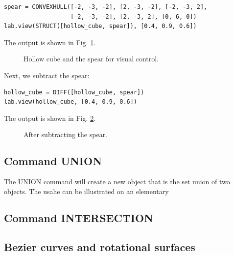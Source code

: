 \documentclass[article,A4,12pt]{llncs}
\begin{document}
\begin{verbatim}
spear = CONVEXHULL([-2, -3, -2], [2, -3, -2], [-2, -3, 2], 
                   [-2, -3, -2], [2, -3, 2], [0, 6, 0]) 
lab.view(STRUCT([hollow_cube, spear]), [0.4, 0.9, 0.6])
\end{verbatim}
The output is shown in Fig. \ref{fig:diff-5}.
\newpage

\begin{figure}[!ht]
\begin{center}
\end{center}
\vspace{-2mm}
\caption{Hollow cube and the spear for visual control.}
\label{fig:diff-5}
\end{figure}
\noindent
Next, we subtract the spear:

\begin{verbatim}
hollow_cube = DIFF([hollow_cube, spear])
lab.view(hollow_cube, [0.4, 0.9, 0.6])
\end{verbatim}
The output is shown in Fig. \ref{fig:diff-6}.
\newpage
\begin{figure}[!ht]
\begin{center}
\end{center}
\vspace{-2mm}
\caption{After subtracting the spear.}
\label{fig:diff-6}
\end{figure}


\subsection{Command UNION}

The UNION command will create a new object that is the set union 
of two objects. The usahe can be illustrated on an elementary 








\subsection{Command INTERSECTION}







\subsection{Bezier curves and rotational surfaces}
\end{document}
